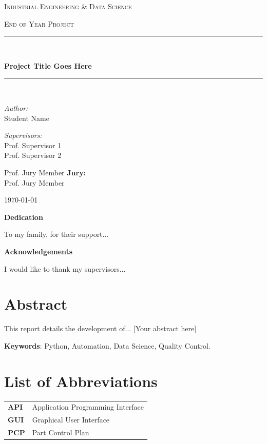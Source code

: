 \documentclass[12pt,a4paper]{report}
\newcommand{\titre}[1]{\def\thetitle{#1}}
\newcommand{\UE}[1]{\def\theue{#1}}
\newcommand{\sujet}[1]{\def\thesujet{#1}}
\newcommand{\enseignant}[1]{\def\theenseignant{#1}}
\newcommand{\eleves}[1]{\def\theeleves{#1}}
\newcommand{\jury}[1]{\def\thejury{#1}}
\newcommand{\fairemarges}{
    \geometry{top=2.5cm, bottom=2.5cm, left=2.5cm, right=2.5cm}
}
\newcommand{\fairepagedegarde}{
    \begin{titlepage}
        \thispagestyle{empty}
        \centering
        \vspace*{1cm}
        
        {\scshape\LARGE \theue \par}
        \vspace{0.5cm}
        {\scshape\Large \thesujet \par}
        
        \vspace{2.5cm}
        
        \rule{\linewidth}{0.5mm} \\[0.4cm]
        {\huge\bfseries \thetitle \par}
        \rule{\linewidth}{0.5mm} \\[1.5cm]
        
        \vspace{1cm}
        
        \begin{minipage}{0.45\textwidth}
            \begin{flushleft} \large
                \emph{Author:}\\
                \theeleves
            \end{flushleft}
        \end{minipage}
        \hfill
        \begin{minipage}{0.45\textwidth}
            \begin{flushright} \large
                \emph{Supervisors:} \\
                \theenseignant
            \end{flushright}
        \end{minipage}

        \vspace{2cm}
        
        \ifx\thejury\empty \else
            \vfill
            {\large \textbf{Jury:} \\ \thejury}
        \fi

        \vfill
        {\large \today\par} 
    \end{titlepage}
}
\begin{document}
\titre{Project Title Goes Here}
\UE{Industrial Engineering \& Data Science}
\sujet{End of Year Project}
\enseignant{Prof. Supervisor 1 \\ Prof. Supervisor 2}
\eleves{Student Name}
\jury{Prof. Jury Member}

\fairepagedegarde
{} 
\setcounter{page}{1}
\fairemarges 


\cleardoublepage
\thispagestyle{empty}
\vspace*{4cm}
\begin{center} \textbf{\Huge Dedication} \end{center}
\vspace{2cm}
\begin{center} \Large
To my family, for their support...
\end{center}

\newpage
\thispagestyle{empty}
\vspace*{4cm}
\begin{center} \textbf{\Huge Acknowledgements} \end{center}
\vspace{2cm}
\begin{center} \Large
I would like to thank my supervisors...
\end{center}

\chapter*{Abstract}
This report details the development of... [Your abstract here]

\newline \newline \hline \vspace{0.5cm}
{\large \textbf{Keywords}: } Python, Automation, Data Science, Quality Control.
\vspace{0.5cm} \hline
\newpage

\chapter*{List of Abbreviations}
\begin{tabular}{ll}
    \textbf{API} & Application Programming Interface \\
    \textbf{GUI} & Graphical User Interface \\
    \textbf{PCP} & Part Control Plan \\
\end{tabular}
\newpage
\end{document}
